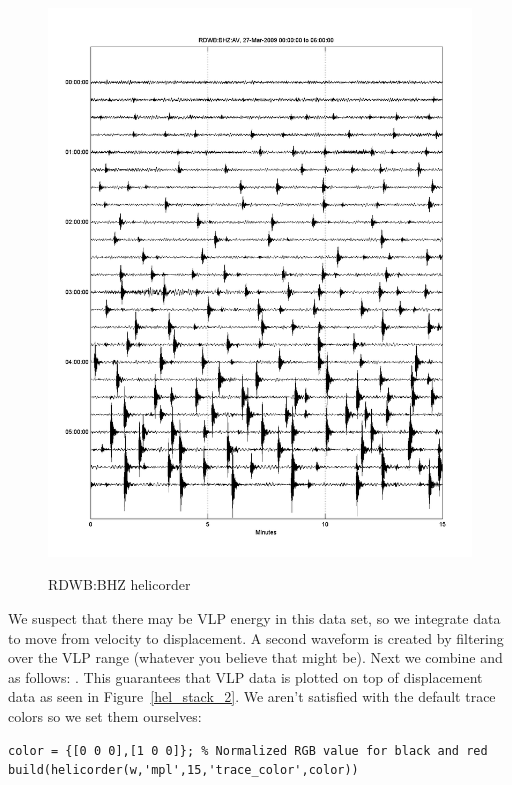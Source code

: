 \documentclass[11pt]{article}
\begin{document}
\begin{figure}[ht] 
\centerline{\scalebox{.6} {\includegraphics{hel_single_2.png}}} 
\caption{RDWB:BHZ helicorder} 
\label{hel_single_2}
\end{figure}
\clearpage

We suspect that there may be VLP energy in this data set, so we integrate  data to move from velocity to displacement. A second waveform  is created by filtering  over the VLP range (whatever you believe that might be). Next we combine  and  as follows: . This guarantees that VLP data is plotted on top of displacement data as seen in Figure~\ref{hel_stack_2}. We aren't satisfied with the default trace colors so we set them ourselves:  

\begin{lstlisting}
color = {[0 0 0],[1 0 0]}; % Normalized RGB value for black and red
build(helicorder(w,'mpl',15,'trace_color',color))
\end{lstlisting}
\end{document}
